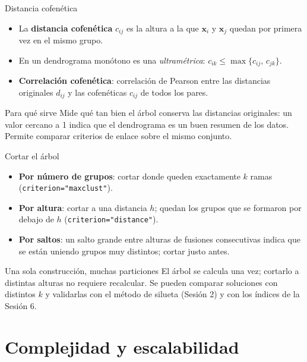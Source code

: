 \documentclass[aspectratio=169,11pt]{beamer}
\newcommand{\x}{\bm{x}}
\begin{document}
\begin{frame}{Distancia cofenética}
  \begin{itemize}
    \item La \textbf{distancia cofenética} $c_{ij}$ es la altura a la que $\x_i$ y $\x_j$ quedan
          por primera vez en el mismo grupo.
    \item En un dendrograma monótono es una \emph{ultramétrica}:
          $c_{ik} \le \max\{c_{ij},\, c_{jk}\}$.
    \item \textbf{Correlación cofenética}: correlación de Pearson entre las distancias originales
          $d_{ij}$ y las cofenéticas $c_{ij}$ de todos los pares.
  \end{itemize}
  \vspace{6pt}
  \begin{block}{Para qué sirve}
    Mide qué tan bien el árbol conserva las distancias originales: un valor cercano a 1
    indica que el dendrograma es un buen resumen de los datos. Permite comparar criterios
    de enlace sobre el mismo conjunto.
  \end{block}
\end{frame}

\begin{frame}{Cortar el árbol}
  \begin{itemize}
    \item \textbf{Por número de grupos}: cortar donde queden exactamente $k$ ramas
          (\texttt{criterion="maxclust"}).
    \item \textbf{Por altura}: cortar a una distancia $h$; quedan los grupos que se formaron
          por debajo de $h$ (\texttt{criterion="distance"}).
    \item \textbf{Por saltos}: un salto grande entre alturas de fusiones consecutivas indica que
          se están uniendo grupos muy distintos; cortar justo antes.
  \end{itemize}
  \vspace{6pt}
  \begin{block}{Una sola construcción, muchas particiones}
    El árbol se calcula una vez; cortarlo a distintas alturas no requiere recalcular.
    Se pueden comparar soluciones con distintos $k$ y validarlas con el método de silueta (Sesión 2)
    y con los índices de la Sesión 6.
  \end{block}
\end{frame}

\section{Complejidad y escalabilidad}
\end{document}
